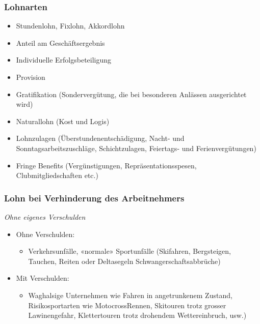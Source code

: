 \subsubsection{Lohnarten}
\begin{minipage}{0.5\linewidth}
    \begin{itemize}
        \item Stundenlohn, Fixlohn, Akkordlohn
        \item Anteil am Geschäftsergebnis
        \item Individuelle Erfolgsbeteiligung
        \item Provision
        \item Gratifikation (Sondervergütung, die bei besonderen Anlässen ausgerichtet wird)
    \end{itemize}
\end{minipage}
\begin{minipage}{0.5\linewidth}
    \begin{itemize}
        \setcounter{enumi}{4}
        \item Naturallohn (Kost und Logis)
        \item Lohnzulagen (Überstundenentschädigung, Nacht- und Sonntagsarbeitszuschläge, Schichtzulagen, Feiertags- und Ferienvergütungen)
        \item Fringe Benefits (Vergünstigungen, Repräsentationsspesen, Clubmitgliedschaften etc.)
    \end{itemize}
\end{minipage}

\subsubsection{Lohn bei Verhinderung des Arbeitnehmers}

\textit{Ohne eigenes Verschulden}
\begin{itemize}
    \item Ohne Verschulden:
    \begin{itemize}
        \item Verkehrsunfälle, «normale» Sportunfälle (Skifahren, Bergsteigen, Tauchen, Reiten oder Deltasegeln Schwangerschaftsabbrüche)
    \end{itemize}
    \item Mit Verschulden:
    \begin{itemize}
        \item Waghalsige Unternehmen wie Fahren in angetrunkenem Zustand, Risikosportarten wie MotocrossRennen, Skitouren trotz grosser Lawinengefahr, Klettertouren trotz drohendem Wettereinbruch, usw.)
    \end{itemize}
\end{itemize}

